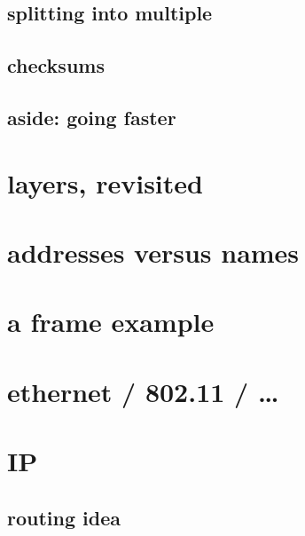 
\subsection{splitting into multiple}


\subsection{checksums}


\subsection{aside: going faster}


\section{layers, revisited}


\section{addresses versus names}



\section{a frame example}



\section{ethernet / 802.11 / \ldots}



\section{IP}



\subsection{routing idea}

